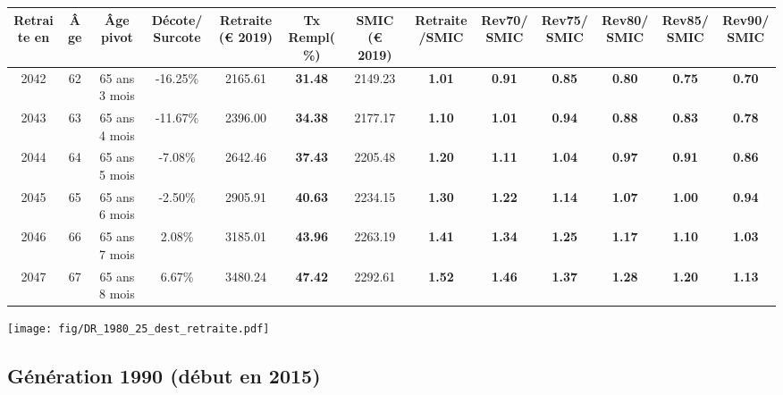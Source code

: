 { \scriptsize \begin{center} 
\begin{tabular}[htb]{|c|c||c|c||c|c||c||c|c|c|c|c|c|} 
\hline 
 Retraite en &  Âge &  Âge pivot &  Décote/Surcote &  Retraite (\euro{} 2019) &  Tx Rempl(\%) &  SMIC (\euro{} 2019) &  Retraite/SMIC &  Rev70/SMIC &  Rev75/SMIC &  Rev80/SMIC &  Rev85/SMIC &  Rev90/SMIC \\ 
\hline \hline 
 2042 &  62 &  65 ans 3 mois &  -16.25\% &  2165.61 &  {\bf 31.48} &  2149.23 &  {\bf 1.01} &  {\bf {\color{red} 0.91}} &  {\bf {\color{red} 0.85}} &  {\bf {\color{red} 0.80}} &  {\bf {\color{red} 0.75}} &  {\bf {\color{red} 0.70}} \\ 
\hline 
 2043 &  63 &  65 ans 4 mois &  -11.67\% &  2396.00 &  {\bf 34.38} &  2177.17 &  {\bf 1.10} &  {\bf 1.01} &  {\bf {\color{red} 0.94}} &  {\bf {\color{red} 0.88}} &  {\bf {\color{red} 0.83}} &  {\bf {\color{red} 0.78}} \\ 
\hline 
 2044 &  64 &  65 ans 5 mois &  -7.08\% &  2642.46 &  {\bf 37.43} &  2205.48 &  {\bf 1.20} &  {\bf 1.11} &  {\bf 1.04} &  {\bf {\color{red} 0.97}} &  {\bf {\color{red} 0.91}} &  {\bf {\color{red} 0.86}} \\ 
\hline 
 2045 &  65 &  65 ans 6 mois &  -2.50\% &  2905.91 &  {\bf 40.63} &  2234.15 &  {\bf 1.30} &  {\bf 1.22} &  {\bf 1.14} &  {\bf 1.07} &  {\bf 1.00} &  {\bf {\color{red} 0.94}} \\ 
\hline 
 2046 &  66 &  65 ans 7 mois &  2.08\% &  3185.01 &  {\bf 43.96} &  2263.19 &  {\bf 1.41} &  {\bf 1.34} &  {\bf 1.25} &  {\bf 1.17} &  {\bf 1.10} &  {\bf 1.03} \\ 
\hline 
 2047 &  67 &  65 ans 8 mois &  6.67\% &  3480.24 &  {\bf 47.42} &  2292.61 &  {\bf 1.52} &  {\bf 1.46} &  {\bf 1.37} &  {\bf 1.28} &  {\bf 1.20} &  {\bf 1.13} \\ 
\hline 
\hline 
\end{tabular} 
\end{center} } 

 \begin{center}\texttt{[image: fig/DR\_1980\_25\_dest\_retraite.pdf]}\end{center} \label{fig/DR_1980_25_dest_retraite.pdf} 

\newpage 
 
\subsection{Génération 1990 (début en 2015)} 


